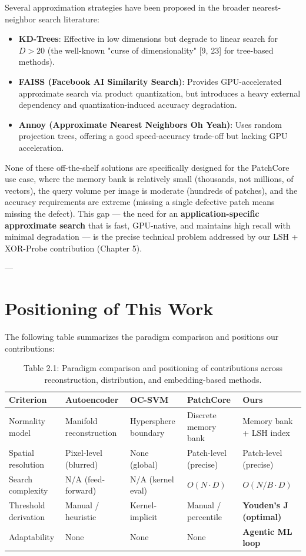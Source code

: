 \documentclass[12pt,a4paper,oneside]{report}
\begin{document}
Several approximation strategies have been proposed in the broader nearest-neighbor search literature:

\begin{itemize}
  \item \textbf{KD-Trees}: Effective in low dimensions but degrade to linear search for $D > 20$ (the well-known "curse of dimensionality" [9, 23] for tree-based methods).
  \item \textbf{FAISS (Facebook AI Similarity Search)}: Provides GPU-accelerated approximate search via product quantization, but introduces a heavy external dependency and quantization-induced accuracy degradation.
  \item \textbf{Annoy (Approximate Nearest Neighbors Oh Yeah)}: Uses random projection trees, offering a good speed-accuracy trade-off but lacking GPU acceleration.
\end{itemize}
None of these off-the-shelf solutions are specifically designed for the PatchCore use case, where the memory bank is relatively small (thousands, not millions, of vectors), the query volume per image is moderate (hundreds of patches), and the accuracy requirements are extreme (missing a single defective patch means missing the defect). This gap --- the need for an \textbf{application-specific approximate search} that is fast, GPU-native, and maintains high recall with minimal degradation --- is the precise technical problem addressed by our LSH + XOR-Probe contribution (Chapter 5).

---

\section{Positioning of This Work}

The following table summarizes the paradigm comparison and positions our contributions:

\begin{longtable}{lllll}
\caption{Table 2.1: Paradigm comparison and positioning of contributions across reconstruction, distribution, and embedding-based methods.} \\
\toprule
Criterion & Autoencoder & OC-SVM & PatchCore & \textbf{Ours} \\
\midrule
\endhead
Normality model & Manifold reconstruction & Hypersphere boundary & Discrete memory bank & Memory bank + LSH index \\
Spatial resolution & Pixel-level (blurred) & None (global) & Patch-level (precise) & Patch-level (precise) \\
Search complexity & N/A (feed-forward) & N/A (kernel eval) & $O(N \cdot D)$ & \textbf{$O(N/B \cdot D)$} \\
Threshold derivation & Manual / heuristic & Kernel-implicit & Manual / percentile & \textbf{Youden's J (optimal)} \\
Adaptability & None & None & None & \textbf{Agentic ML loop} \\
\bottomrule
\end{longtable}
\end{document}
